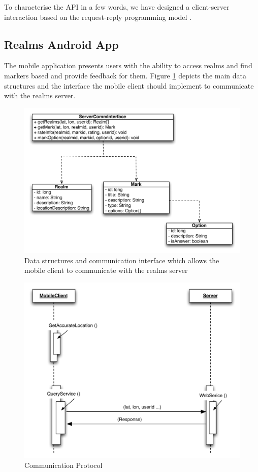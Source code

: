 \noindent To characterise the API in a few words, we have designed a client-server interaction based on the request-reply programming model \cite{Coulouris:2005}.

\subsection{Realms Android App} %
\label{sub:realms_android_app}
The mobile application presents users with the ability to access realms and find markers based and provide feedback for them. Figure \ref{fig.design.mobile_client} depicts the main data structures and the interface the mobile client should implement to communicate with the realms server.
\begin{figure}[H]
	\centering
	\includegraphics[width=1.0\linewidth]{fig/mobile_client}
	\caption{Data structures and communication interface which allows the mobile client to communicate with the realms server}
	\label{fig.design.mobile_client}
\end{figure}
\begin{figure}[H]
	\centering
	\includegraphics[width=1.0\linewidth]{fig/abstract_communication_protocol}
	\caption{Communication Protocol}
	\label{fig.design.comm_protocol}
\end{figure}
